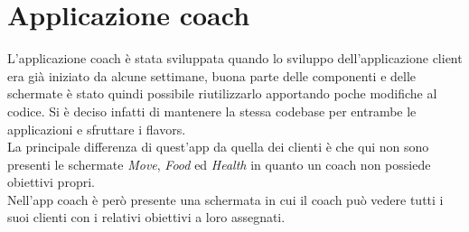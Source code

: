 \section{Applicazione coach}
L'applicazione coach è stata sviluppata quando lo sviluppo dell'applicazione client era già iniziato da alcune settimane, buona parte delle componenti e delle schermate è stato quindi possibile riutilizzarlo apportando poche modifiche al codice. Si è deciso infatti di mantenere la stessa \gls{codebase} per entrambe le applicazioni e sfruttare i flavors.\\
La principale differenza di quest'app da quella dei clienti è che qui non sono presenti le schermate \textit{Move}, \textit{Food} ed \textit{Health} in quanto un coach non possiede obiettivi propri.\\
Nell'app coach è però presente una schermata in cui il coach può vedere tutti i suoi clienti con i relativi obiettivi a loro assegnati.\\
